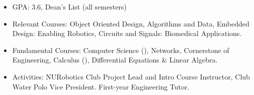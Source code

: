 \documentclass[10pt,a4paper,ragged2e,withhyper]{altacv}
\newcommand{\rom}[1]{\uppercase\expandafter{\romannumeral #1\relax}}
\begin{document}
\vspace{-2em}
\begin{paracol}{2}

    \begin{itemize}
        \item GPA: 3.6, Dean's List (all semesters)
        \item Relevant Courses: Object Oriented Design, Algorithms and Data, Embedded Design: Enabling Robotics, Circuits and Signals: Biomedical Applications.
        \item Fundamental Courses: Computer Science (\rom{2}), Networks, Cornerstone of Engineering, Calculus (\rom{3}), Differential Equations \& Linear Algebra.
        \item Activities: NURobotics Club Project Lead and Intro Course Instructor, Club Water Polo Vice President. First-year Engineering Tutor.
    \end{itemize}



\end{paracol}
\end{document}
